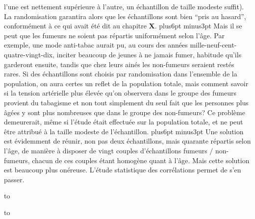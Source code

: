 l'une est nettement sup\'erieure \`a l'autre, un \'echantillon de taille 
mo\-deste suffit). La randomisation garantira alors que les 
\'echantillons sont bien ``pris au hasard'', conform\'ement \`a ce qui 
avait \'et\'e dit au chapitre {\bf X}. 
\vskip6pt plus6pt minus3pt
Mais il se peut que les fumeurs ne soient pas r\'epartis uniform\'ement 
selon l'\^age. Par exemple, une mode anti-tabac aurait pu, au cours des 
ann\'ees mille-neuf-cent-quatre-vingt-dix, inciter beaucoup de jeunes \`a
ne jamais fumer, habitude qu'ils garderont ensuite, tandis que chez leurs
ain\'es les non-fumeurs seraient rest\'es rares. Si des \'echantillons
sont choisis par randomisation dans l'ensemble de la population, on aura
certes un reflet de la population totale, mais comment savoir si la tension 
art\'erielle plus \'elev\'ee qu'on observera dans le groupe des fumeurs 
provient du tabagisme et non tout simplement du seul fait que les 
personnes plus \^ag\'ees y sont plus nombreuses que dans le groupe des 
non-fumeurs? Ce probl\`eme demeurerait, m\^eme si l'\'etude \'etait 
effectu\'ee sur la population totale, et ne peut \^etre attribu\'e \`a la
taille modeste de l'\'echantillon. 
\vskip6pt plus6pt minus3pt
Une solution est \'evidemment de r\'eunir, non pas deux \'echantillons, 
mais quarante r\'epartis selon l'\^age, de mani\`ere \`a disposer de
vingt couples d'\'echantillons fumeurs $/$ non-fumeurs, chacun de ces 
couples \'etant homog\`ene quant \`a l'\^age. Mais cette solution est 
beaucoup plus on\'ereuse. L'\'etude statistique des corr\'elations
permet de s'en passer. 
\medskip 
 
\midinsert 
\vbox to 
\endinsert 
 
\midinsert 
\vbox to  
\endinsert 
 
